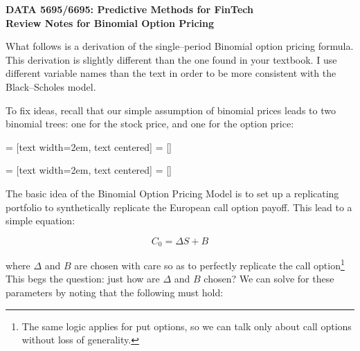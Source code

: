 \documentclass[11pt]{article}
\begin{document}
\textbf{DATA 5695/6695: Predictive Methods for FinTech} \\
\textbf{Review Notes for Binomial Option Pricing} \\
\vspace{5mm}

\bigskip
What follows is a derivation of the single--period Binomial option pricing formula.
This derivation is slightly different than the one found in your textbook.  I use different variable names than the text in order
to be more consistent with the Black--Scholes model.


\vspace{5mm}
To fix ideas, recall that our simple assumption of binomial prices leads to two
binomial trees: one for the stock price, and one for the option price:

\vspace{10mm}
\begin{center}
 = [text width=2em, text centered]
 = []
\end{center}

\vspace{10mm}
\begin{center}
 = [text width=2em, text centered]
 = []
\end{center}

\medskip
The basic idea of the Binomial Option Pricing Model is to set up a replicating portfolio to synthetically
replicate the European call option payoff. This lead to a simple equation:

\medskip
\begin{equation*}
C_{0} = \Delta S + B
\end{equation*}

\medskip
where $\Delta$ and $B$ are chosen with care so as to perfectly replicate the call option\footnote{The same logic
applies for put options, so we can talk only about call options without loss of generality.} This begs the
question: just how are $\Delta$ and $B$ chosen? We can solve for these parameters by noting that the following
must hold:
\end{document}
